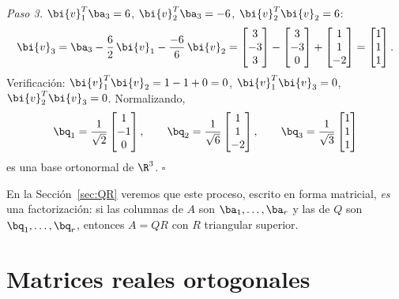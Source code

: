 \begin{ejemplo}
\emph{Paso 3.} $\bi{v}_1^T\ba_3=6$, $\bi{v}_2^T\ba_3=-6$,
$\bi{v}_2^T\bi{v}_2=6$:
\[
\bi{v}_3=\ba_3-\frac{6}{2}\,\bi{v}_1-\frac{-6}{6}\,\bi{v}_2
=\begin{bmatrix}3\\-3\\3\end{bmatrix}
-\begin{bmatrix}3\\-3\\0\end{bmatrix}
+\begin{bmatrix}1\\1\\-2\end{bmatrix}
=\begin{bmatrix}1\\1\\1\end{bmatrix}.
\]
Verificación: $\bi{v}_1^T\bi{v}_2=1-1+0=0$,
$\bi{v}_1^T\bi{v}_3=0$, $\bi{v}_2^T\bi{v}_3=0$. Normalizando,
\[
\bq_1=\frac{1}{\sqrt2}\begin{bmatrix}1\\-1\\0\end{bmatrix},\qquad
\bq_2=\frac{1}{\sqrt6}\begin{bmatrix}1\\1\\-2\end{bmatrix},\qquad
\bq_3=\frac{1}{\sqrt3}\begin{bmatrix}1\\1\\1\end{bmatrix}
\]
es una base ortonormal de $\R^3$. \hfill$\square$
\end{ejemplo}

\begin{observacion}
En la Sección~\ref{sec:QR} veremos que este proceso, escrito en forma
matricial, \emph{es} una factorización: si las columnas de $A$ son
$\ba_1,\dots,\ba_r$ y las de $Q$ son $\bq_1,\dots,\bq_r$, entonces
$A=QR$ con $R$ triangular superior.
\end{observacion}

\section{Matrices  reales ortogonales}\label{sec:matrices-ortogonales}


